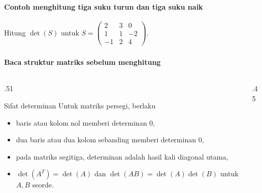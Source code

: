 \documentclass{../../kalkulus-ppt}
\begin{document}
\begin{frame}
    \frametitle{\insertsection}
    \framesubtitle{Contoh menghitung tiga suku turun dan tiga suku naik}
    \begin{contoh}
        Hitung $\det(S)$ untuk $S=\begin{pmatrix}2&3&0\\1&1&-2\\-1&2&4\end{pmatrix}$.
    \end{contoh}
\end{frame}

\begin{frame}
    \frametitle{\insertsection}
    \framesubtitle{Baca struktur matriks sebelum menghitung}
    \begin{columns}[c,onlytextwidth]
        \begin{column}{.51\textwidth}
            \begin{block}{Sifat determinan}
                Untuk matriks persegi, berlaku
                \begin{itemize}
                    \item baris atau kolom nol memberi determinan $0$,
                    \item dua baris atau dua kolom sebanding memberi determinan $0$,
                    \item pada matriks segitiga, determinan adalah hasil kali diagonal utama,
                    \item $\det(A^T)=\det(A)$ dan $\det(AB)=\det(A)\det(B)$ untuk $A,B$ seorde.
                \end{itemize}
            \end{block}
        \end{column}
        \begin{column}{.45\textwidth}
        \end{column}
    \end{columns}
\end{frame}
\end{document}
